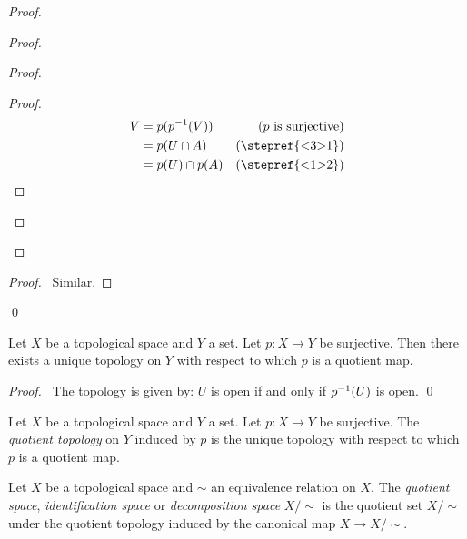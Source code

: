 \begin{proof}
\begin{proof}
\begin{proof}
      \begin{proof}
        \pf
        \begin{align*}
          V & = p(\inv{p}(V)) & (\text{$p$ is surjective})\\
          & = p(U \cap A) & (\text{\stepref{<3>1}}) \\
          & = p(U) \cap p(A) & (\text{\stepref{<1>2}})
        \end{align*}
      \end{proof}
    \end{proof}
  \end{proof}
  \begin{proof}
    \pf\ Similar.
  \end{proof}
  \qed
\end{proof}

\begin{prop}
  Let $X$ be a topological space and $Y$ a set. Let $p : X \rightarrow Y$ be surjective. Then there exists a unique topology on $Y$ with respect to which $p$ is a quotient map.
\end{prop}

\begin{proof}
  \pf\ The topology is given by: $U$ is open if and only if ${p}^{-1}(U)$ is open. \qed
\end{proof}

\begin{df}
  Let $X$ be a topological space and $Y$ a set. Let $p : X \rightarrow Y$ be surjective. The \emph{quotient topology} on $Y$ induced by $p$ is the unique topology with respect to which $p$ is a quotient map.
\end{df}

\begin{df}
  Let $X$ be a topological space and $\sim$ an equivalence relation on $X$. The \emph{quotient space}, \emph{identification space} or \emph{decomposition space} $X / \sim$ is the quotient set $X / \sim$ under the quotient topology induced by the canonical map $X \rightarrow X / \sim$.
\end{df}
